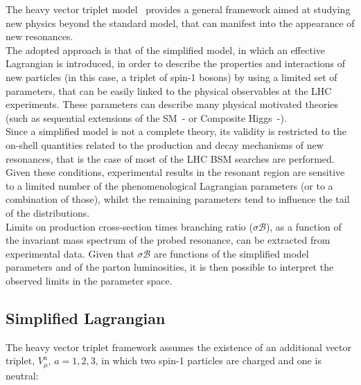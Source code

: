 The heavy vector triplet model~\cite{Pappadopulo2014} provides a general framework aimed at studying new physics beyond the standard model, that can manifest into the appearance of new resonances.\\
The adopted approach is that of the simplified model, in which an effective Lagrangian is introduced, in order to describe the properties and interactions of new particles (in this case, a triplet of spin-1 bosons) by using a limited set of parameters, that can be easily linked to the physical observables at the LHC experiments. These parameters can describe many physical motivated theories (such as sequential extensions of the SM~\cite{Barger:1980ix}-\cite{Grojean:2011vu} or Composite Higgs~\cite{Contino2011}-\cite{Bellazzini:2014yua}). \\
Since a simplified model is not a complete theory, its validity is restricted to the on-shell quantities related to the production and decay mechanisms of new resonances, that is the case of most of the LHC BSM searches are performed. Given these conditions, experimental results in the resonant region are sensitive to a limited number of the phenomenological Lagrangian parameters (or to a combination of those), whilst the remaining parameters tend to influence the tail of the distributions.\\
Limits on production cross-section times branching ratio ($\sigma  \mathcal{B}$), as a function of the invariant mass spectrum of the probed resonance, can be extracted from experimental data. Given that $\sigma  \mathcal{B}$ are functions of the simplified model parameters and of the parton luminosities, it is then possible to interpret the observed limits in the parameter space.

\subsection{Simplified Lagrangian}
\label{sec:HVT_lagr}

The heavy vector triplet framework assumes the existence of an additional vector triplet, $V_{\mu}^a$, $a=1,2,3$, in which two spin-1 particles are charged and one is neutral:

